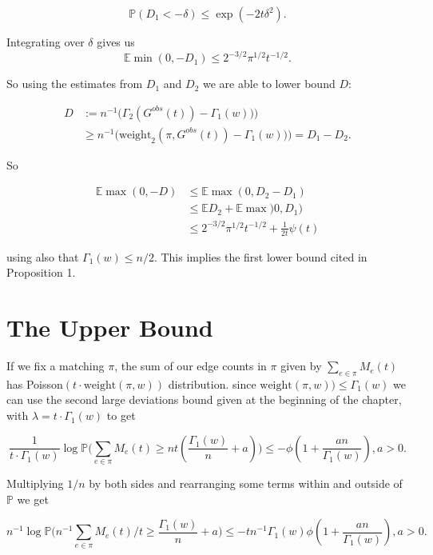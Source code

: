 $$\mathbb{P}(D_1 < -\delta) \leq \exp(-2t\delta^2). $$

Integrating over $\delta$ gives us 
$$\mathbb{E}\min(0, -D_1) \leq 2^{-3/2}\pi^{1/2}t^{-1/2}. $$

So using the estimates from $D_1$ and $D_2$ we are able to lower bound $D$:

\begin{equation}
\begin{split}
D &:= n^{-1}\big( \Gamma_2(G^{obs}(t))-\Gamma_1(w))\big)\\
&\geq n^{-1}\big(\text{weight}_2(\pi, G^{obs}(t))-\Gamma_1(w))\big) = D_1-D_2.
\end{split}
\end{equation}

So 

\begin{equation}
\begin{split}
\mathbb{E}\max(0, -D) &\leq \mathbb{E}\max(0, D_2-D_1)\\
&\leq \mathbb{E}D_2+\mathbb{E}\max)0, D_1)\\
&\leq 2^{-3/2}\pi^{1/2}t^{-1/2} +\frac{1}{2t}\psi(t)
\end{split}
\end{equation}

using also that $\Gamma_1(w) \leq n/2$.  This implies the first lower bound cited in Proposition 1.  

\section{The Upper Bound}

If we fix a matching $\pi$, the sum of our edge counts in $\pi$ given by $\sum_{e \in \pi}M_e(t)$ has Poisson$(t \cdot \text{weight}(\pi, w))$ distribution.  since $\text{weight}(\pi, w)) \leq \Gamma_1(w)$ we can use the second large deviations bound given at the beginning of the chapter, with $\lambda = t \cdot \Gamma_1(w)$ to get

$$ \frac{1}{t \cdot \Gamma_1(w)}\log \mathbb{P}\bigg( \sum_{e \in \pi} M_e(t) \geq nt(\frac{\Gamma_1(w)}{n}+a)\bigg) \leq -\phi(1+\frac{an}{\Gamma_1(w)}), a >0.$$

Multiplying $1/n$ by both sides and rearranging some terms within and outside of $\mathbb{P}$ we get 

\begin{equation}
n^{-1}\log \mathbb{P}\bigg( n^{-1} \sum_{e \in \pi} M_e(t)/t \geq \frac{\Gamma_1(w)}{n}+a\bigg) \leq -tn^{-1}\Gamma_1(w)\phi(1+\frac{an}{\Gamma_1(w)}), a >0.
\end{equation} 

